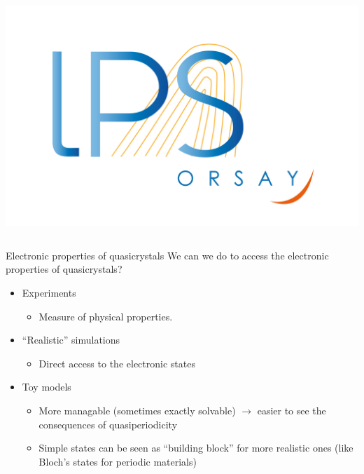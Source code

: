 \documentclass[xcolor=x11names,compress,professionalfonts]{beamer}
\renewcommand{\(}{\begin{columns}}
\renewcommand{\)}{\end{columns}}
\newcommand{\<}[1]{\begin{column}{#1}}
\renewcommand{\>}{\end{column}}
\begin{document}
\begin{frame}
\begin{columns}
\begin{column}{2cm}
~\\
~\\
\raggedleft
\includegraphics[scale=.15]{img/logo-lps.jpg}
\end{column}
\end{columns}
\end{frame}

\begin{frame}{Electronic properties of quasicrystals}
We can we do to access the electronic properties of quasicrystals?
\begin{itemize}
	\item Experiments
	\begin{itemize}
		\item Measure of physical properties.
	\end{itemize}
	\item ``Realistic'' simulations
	\begin{itemize}
		\item Direct access to the electronic states 
	\end{itemize}
	\item Toy models
	\begin{itemize}
		\item More managable (sometimes exactly solvable) $\rightarrow$ easier to see the consequences of quasiperiodicity
		\item Simple states can be seen as ``building block'' for more realistic ones (like Bloch's states for periodic materials)
	\end{itemize}
\end{itemize}

\end{frame}
\end{document}
